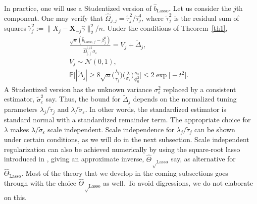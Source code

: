 \documentclass[aos,MSNbibl,dvips]{arximspdf}
\def\cal{\mathcal}
\newcommand{\PP}{\mathbb{P}}
\newcommand{\bx}{\mathbf{X}}
\begin{document}
\begin{remark} \label{studentizeremark} In practice, one will use
a Studentized version of $\hat b_\mathrm{Lasso} $. Let us consider the
$j$th component.
One may verify that
$\hat\Omega_{j,j} =\tilde\tau_j^2 / \hat\tau_j^4 $,
where $\tilde\tau_j^2$ is the residual sum of squares
$\tilde\tau_j^2:= \| X_j - \bx_{-j} \hat\gamma\|_2^2 / n $.
Under the conditions of Theorem~\ref{th1},
%
\begin{eqnarray*}
&\displaystyle \frac{\sqrt n ( \hat{b}_{\mathrm{Lasso},j } - \beta_j^0 ) } {
\hat\Omega_{j,j}^{1/2} \sigma_{\varepsilon} } = V_j + \tilde\Delta _j,&
\\
& V_j \sim{\cal N} (0, 1),&
\\
&\displaystyle \PP \biggl[|\tilde\Delta_j | \ge8 \sqrt n \biggl(
\frac{\lambda_j
} { \tilde\tau_j } \biggr) \biggl(\frac{\lambda} { \sigma_{\varepsilon}} \biggr) \frac{ s_0}{\phi_0^2 }
\biggr] \le2 \exp\bigl[-{t^2}\bigr].&
\end{eqnarray*}
%
A Studentized version has the unknown variance $\sigma_{\varepsilon}^2$
replaced by a consistent estimator, $\tilde\sigma_{\varepsilon}^2$ say.
Thus, the bound for $\tilde\Delta_j $ depends on the normalized
tuning parameters $\lambda_j/ \tilde\tau_j$ and $\lambda/ \tilde
\sigma
_{\varepsilon}$.
In other words, the standardized estimator is standard normal with a
standardized remainder term.
The appropriate choice for $\lambda$ makes $\lambda/ \tilde\sigma
_{\varepsilon}$
scale independent. Scale independence for $\lambda_j/ \tilde\tau_j$
can be shown under
certain conditions, as we will do in the next subsection. Scale
independent regularization
can also be achieved numerically by
using the square-root lasso introduced in \cite{belloni2011square},
giving an approximate inverse, $\hat\Theta_{\sqrt\mathrm{Lasso}}$ say,
as alternative for $\hat\Theta_\mathrm{Lasso}$. Most of the theory that
we develop
in the coming subsections goes through with the choice $\hat\Theta
_{\sqrt\mathrm{Lasso}}$ as well. To avoid digressions, we do
not elaborate on this.
\end{remark}
\end{document}
